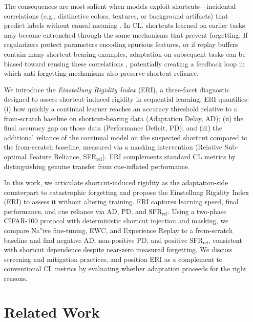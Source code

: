 \documentclass[conference]{IEEEtran}
\begin{document}
The consequences are most salient when models exploit shortcuts—incidental correlations (e.g., distinctive colors, textures, or background artifacts) that predict labels without causal meaning \cite{Geirhos_2020,Hermann2023OnTF}. In CL, shortcuts learned on earlier tasks may become entrenched through the same mechanisms that prevent forgetting. If regularizers protect parameters encoding spurious features, or if replay buffers contain many shortcut-bearing examples, adaptation on subsequent tasks can be biased toward reusing these correlations \cite{Murali2023ShortcutLT}, potentially creating a feedback loop in which anti-forgetting mechanisms also preserve shortcut reliance.
 
We introduce the \emph{Einstellung Rigidity Index} (ERI), a three-facet diagnostic designed to assess shortcut-induced rigidity in sequential learning. ERI quantifies: (i) how quickly a continual learner reaches an accuracy threshold relative to a from-scratch baseline on shortcut-bearing data (Adaptation Delay, AD); (ii) the final accuracy gap on those data (Performance Deficit, PD); and (iii) the additional reliance of the continual model on the suspected shortcut compared to the from-scratch baseline, measured via a masking intervention (Relative Sub-optimal Feature Reliance, SFR\(_{\mathrm{rel}}\)). ERI complements standard CL metrics by distinguishing genuine transfer from cue-inflated performance.
 
In this work, we articulate shortcut-induced rigidity as the adaptation-side counterpart to catastrophic forgetting and propose the Einstellung Rigidity Index (ERI) to assess it without altering training. ERI captures learning speed, final performance, and cue reliance via AD, PD, and SFR\(_{\mathrm{rel}}\). Using a two-phase CIFAR-100 protocol with deterministic shortcut injection and masking, we compare Na"ive fine-tuning, EWC, and Experience Replay to a from-scratch baseline and find negative AD, non-positive PD, and positive SFR\(_{\mathrm{rel}}\), consistent with shortcut dependence despite near-zero measured forgetting. We discuss screening and mitigation practices, and position ERI as a complement to conventional CL metrics by evaluating whether adaptation proceeds for the right reasons.

\section{Related Work}
\end{document}

